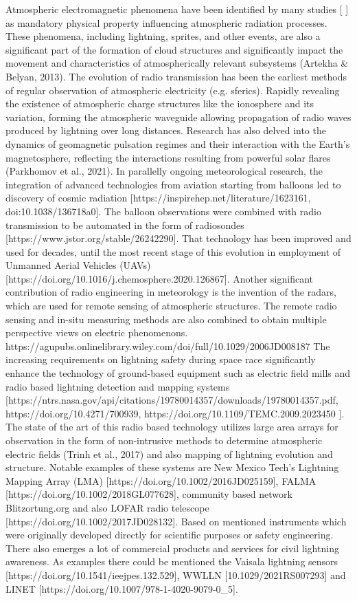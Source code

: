 Atmospheric electromagnetic phenomena have been identified by many studies [ ] as mandatory physical property influencing atmospheric radiation processes. These phenomena, including lightning, sprites, and other events, are also a significant part of  the formation of cloud structures and significantly impact the movement and characteristics of atmospherically relevant subsystems (Artekha & Belyan, 2013).
The evolution of radio transmission has been the earliest methods of regular observation of atmospheric electricity (e.g. sferics). Rapidly revealing the existence of atmospheric charge structures like the ionosphere and its variation, forming the atmospheric waveguide allowing propagation of radio waves produced by lightning over long distances.  Research has also delved into the dynamics of geomagnetic pulsation regimes and their interaction with the Earth's magnetosphere, reflecting the interactions resulting from powerful solar flares (Parkhomov et al., 2021).
In parallelly ongoing meteorological research, the integration of advanced technologies from aviation starting from balloons led to discovery of cosmic radiation [https://inspirehep.net/literature/1623161, doi:10.1038/136718a0]. The balloon observations were combined with radio transmission to be automated in the form of radiosondes [https://www.jstor.org/stable/26242290]. That technology has been improved and used for decades, until the most recent stage of this evolution in employment of Unmanned Aerial Vehicles (UAVs) [https://doi.org/10.1016/j.chemosphere.2020.126867].
Another significant contribution of  radio engineering in meteorology is the invention of the radars, which are used for remote sensing of atmospheric structures.  The remote radio sensing and in-situ measuring methods are also combined to obtain multiple perspective views on electric phenomenons.  https://agupubs.onlinelibrary.wiley.com/doi/full/10.1029/2006JD008187
The increasing requirements on lightning safety during space race significantly enhance the technology of ground-based equipment such as electric field mills and radio based lightning detection and mapping systems [https://ntrs.nasa.gov/api/citations/19780014357/downloads/19780014357.pdf, https://doi.org/10.4271/700939, https://doi.org/10.1109/TEMC.2009.2023450 ]. The state of the art of this radio based technology utilizes large area arrays for observation in the form of non-intrusive methods to determine atmospheric electric fields (Trinh et al., 2017) and also mapping of lightning evolution and structure. Notable examples of these systems are New Mexico Tech's Lightning Mapping Array (LMA) [https://doi.org/10.1002/2016JD025159],  FALMA [https://doi.org/10.1002/2018GL077628], community based network Blitzortung.org and also LOFAR radio telescope  [https://doi.org/10.1002/2017JD028132].
Based on mentioned instruments which were originally developed directly for scientific purposes or safety engineering. There also emerges a lot of commercial products and services for civil lightning awareness. As examples there could be mentioned the Vaisala lightning sensors [https://doi.org/10.1541/ieejpes.132.529],  WWLLN [10.1029/2021RS007293] and LINET [https://doi.org/10.1007/978-1-4020-9079-0_5].


